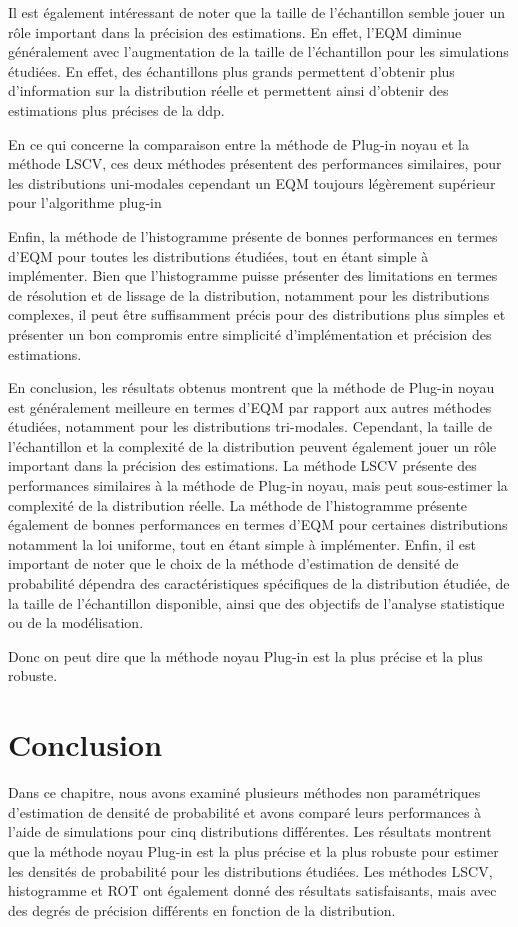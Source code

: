 Il est également intéressant de noter que la taille de l'échantillon semble jouer un rôle important dans la précision des estimations. En effet, l'EQM diminue généralement avec l'augmentation de la taille de l'échantillon pour les simulations étudiées. En effet, des échantillons plus grands permettent d'obtenir plus d'information sur la distribution réelle et permettent ainsi d'obtenir des estimations plus précises de la ddp.

En ce qui concerne la comparaison entre la méthode de Plug-in noyau et la méthode LSCV,  ces deux méthodes présentent des performances similaires, pour les distributions uni-modales cependant un EQM toujours légèrement supérieur pour l'algorithme plug-in 

Enfin, la méthode de l'histogramme présente de bonnes performances en termes d'EQM pour toutes les distributions étudiées, tout en étant simple à implémenter. Bien que l'histogramme puisse présenter des limitations en termes de résolution et de lissage de la distribution, notamment pour les distributions complexes, il peut être suffisamment précis pour des distributions plus simples et présenter un bon compromis entre simplicité d'implémentation et précision des estimations.

En conclusion, les résultats obtenus montrent que la méthode de Plug-in noyau est généralement meilleure en termes d'EQM par rapport aux autres méthodes étudiées, notamment pour les distributions tri-modales. Cependant, la taille de l'échantillon et la complexité de la distribution peuvent également jouer un rôle important dans la précision des estimations. La méthode LSCV présente des performances similaires à la méthode de Plug-in noyau, mais peut sous-estimer la complexité de la distribution réelle. La méthode de l'histogramme présente également de bonnes performances en termes d'EQM pour certaines distributions notamment la loi uniforme, tout en étant simple à implémenter. Enfin, il est important de noter que le choix de la méthode d'estimation de densité de probabilité dépendra des caractéristiques spécifiques de la distribution étudiée, de la taille de l'échantillon disponible, ainsi que des objectifs de l'analyse statistique ou de la modélisation.

Donc on peut dire que la méthode noyau Plug-in est la plus précise et la plus robuste.

\section{Conclusion}
Dans ce chapitre, nous avons examiné plusieurs méthodes non paramétriques d'estimation de densité de probabilité et avons comparé leurs performances à l'aide de simulations pour cinq distributions différentes. Les résultats montrent que la méthode noyau Plug-in est la plus précise et la plus robuste pour estimer les densités de probabilité pour les distributions étudiées. Les méthodes LSCV, histogramme et ROT ont également donné des résultats satisfaisants, mais avec des degrés de précision différents en fonction de la distribution.

